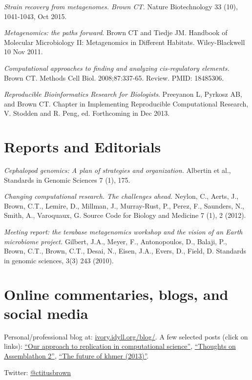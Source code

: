 \documentclass[margin,line]{resume}
\begin{document}
\begin{resume}
{\em Strain recovery from metagenomes. Brown CT.} Nature Biotechnology
33 (10), 1041-1043, Oct 2015.

{\em Metagenomics: the paths forward}.  Brown CT and Tiedje JM.
Handbook of Molecular Microbiology II: Metagenomics in Different
Habitats.  Wiley-Blackwell 10 Nov 2011.

{\em Computational approaches to finding and analyzing cis-regulatory elements.} 
Brown CT. Methods Cell Biol. 2008;87:337-65. Review.
PMID: 18485306.

{\em Reproducible Bioinformatics Research for Biologists}.  Preeyanon
L, Pyrkosz AB, and Brown CT. Chapter in Implementing Reproducible
Computational Research, V. Stodden and R. Peng, ed.  Forthcoming in
Dec 2013.

\section{\mysidestyle Reports and Editorials}

{\em Cephalopod genomics: A plan of strategies and organization.} Albertin et al., Standards in Genomic Sciences 7 (1), 175.

{\em Changing computational research. The challenges ahead.}
Neylon, C., Aerts, J., Brown, C.T., Lemire, D., Millman, J., Murray-Rust, P., Perez, F., Saunders, N., Smith, A., Varoquaux, G.
Source Code for Biology and Medicine 7 (1), 2 (2012).

{\em Meeting report: the terabase metagenomics workshop and the vision of an Earth microbiome project.}
Gilbert, J.A., Meyer, F., Antonopoulos, D., Balaji, P., Brown, C.T., Brown, C.T., Desai, N., Eisen, J.A., Evers, D., Field, D. Standards in genomic sciences, 3(3) 243 (2010).

\section{\mysidestyle Online commentaries, blogs, and social media}

Personal/professional blog at: \href{http://ivory.idyll.org/blog/}{ivory.idyll.org/blog/}.  A few selected posts (click on links): \href{http://ivory.idyll.org/blog/replication-i.html}{``Our approach to replication in computational science''}, \href{http://ivory.idyll.org/blog/thoughts-on-assemblathon-2.html}{``Thoughts on Assemblathon 2''}, \href{http://ivory.idyll.org/blog/the-future-of-khmer-2013-version.html}{``The future of khmer (2013)''}.

Twitter: \href{http://twitter.com/ctitusbrown}{@ctitusbrown}


\end{resume}
\end{document}
